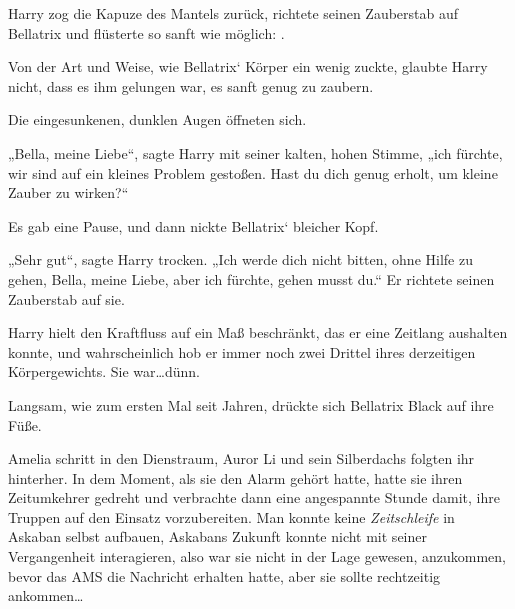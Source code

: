 Harry zog die Kapuze des Mantels zurück, richtete seinen Zauberstab auf Bellatrix und flüsterte so sanft wie möglich: .

Von der Art und Weise, wie Bellatrix‘ Körper ein wenig zuckte, glaubte Harry nicht, dass es ihm gelungen war, es sanft genug zu zaubern.

Die eingesunkenen, dunklen Augen öffneten sich.

„Bella, meine Liebe“, sagte Harry mit seiner kalten, hohen Stimme, „ich fürchte, wir sind auf ein kleines Problem gestoßen. Hast du dich genug erholt, um kleine Zauber zu wirken?“

Es gab eine Pause, und dann nickte Bellatrix‘ bleicher Kopf.

„Sehr gut“, sagte Harry trocken. „Ich werde dich nicht bitten, ohne Hilfe zu gehen, Bella, meine Liebe, aber ich fürchte, gehen musst du.“ Er richtete seinen Zauberstab auf sie. 

Harry hielt den Kraftfluss auf ein Maß beschränkt, das er eine Zeitlang aushalten konnte, und wahrscheinlich hob er immer noch zwei Drittel ihres derzeitigen Körpergewichts. Sie war…dünn.

Langsam, wie zum ersten Mal seit Jahren, drückte sich Bellatrix Black auf ihre Füße.

\later

Amelia schritt in den Dienstraum, Auror Li und sein Silberdachs folgten ihr hinterher. In dem Moment, als sie den Alarm gehört hatte, hatte sie ihren Zeitumkehrer gedreht und verbrachte dann eine angespannte Stunde damit, ihre Truppen auf den Einsatz vorzubereiten. Man konnte keine \emph{Zeitschleife} in Askaban selbst aufbauen, Askabans Zukunft konnte nicht mit seiner Vergangenheit interagieren, also war sie nicht in der Lage gewesen, anzukommen, bevor das AMS die Nachricht erhalten hatte, aber sie sollte rechtzeitig ankommen…

